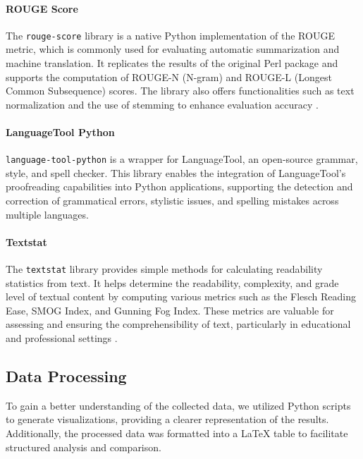 \paragraph{ROUGE Score}
The \texttt{rouge-score} library is a native Python implementation of the ROUGE metric, which is commonly used for evaluating automatic summarization and machine translation. It replicates the results of the original Perl package and supports the computation of ROUGE-N (N-gram) and ROUGE-L (Longest Common Subsequence) scores. The library also offers functionalities such as text normalization and the use of stemming to enhance evaluation accuracy \cite{rouge-score}.

\paragraph{LanguageTool Python}
\texttt{language-tool-python} is a wrapper for LanguageTool, an open-source grammar, style, and spell checker. This library enables the integration of LanguageTool's proofreading capabilities into Python applications, supporting the detection and correction of grammatical errors, stylistic issues, and spelling mistakes across multiple languages.

\paragraph{Textstat}
The \texttt{textstat} library provides simple methods for calculating readability statistics from text. It helps determine the readability, complexity, and grade level of textual content by computing various metrics such as the Flesch Reading Ease, SMOG Index, and Gunning Fog Index. These metrics are valuable for assessing and ensuring the comprehensibility of text, particularly in educational and professional settings \cite{textstat}.




\subsection{Data Processing}

To gain a better understanding of the collected data, we utilized Python scripts to generate visualizations, 
providing a clearer representation of the results. Additionally, the processed data was formatted into a LaTeX table to facilitate structured analysis and comparison.

